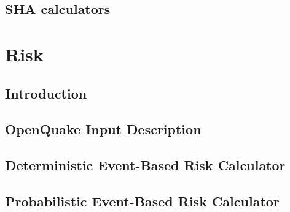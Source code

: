 \documentclass[11pt,a4paper,headings=small,version=first,dvips]{scrbook}
\begin{document}
\chapter{SHA calculators}
	\label{chap:hazcalc}
	
	
	
	
%	
%	
\part{Risk}
\chapter{Introduction}
	\label{chap:intrisk}
	
\chapter{OpenQuake Input Description}
	
\chapter{Deterministic Event-Based Risk Calculator}
	
\chapter{Probabilistic Event-Based Risk Calculator}
	
\end{document}
